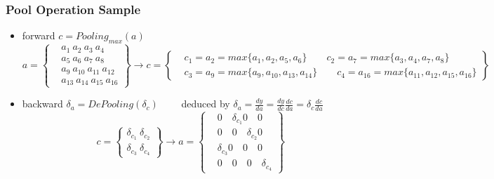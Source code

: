 \begin{frame}
\frametitle{Pool Operation Sample}
	\tiny
	\begin{itemize}
		\item forward $c=Pooling_{max}(a)$
			\begin{equation*}
				a=
				\left\{
					\begin{aligned}
						  &a_1 \ a_2 \ a_3 \ a_4
						\\&a_5 \ a_6 \ a_7 \ a_8
						\\&a_9 \ a_{10} \ a_{11} \ a_{12}
						\\&a_{13} \ a_{14} \ a_{15} \ a_{16}
					\end{aligned}
				\right\}
			\to	c=
				\left\{
					\begin{aligned}
						  &c_1=a_2=max\{a_1,a_2,a_5,a_6\} \qquad c_2=a_7=max\{a_3,a_4,a_7,a_8\}
						\\  &c_3=a_9=max\{a_9,a_{10},a_{13},a_{14}\} \qquad c_4=a_{16}=max\{a_{11},a_{12},a_{15},a_{16}\}
					\end{aligned}
				\right\}
			\end{equation*}
		\item backward $\delta_a=DePooling(\delta_c) \qquad $ deduced by $\delta_a=\frac{dy}{da}=\frac{dy}{dc}\frac{dc}{da}=\delta_c\frac{dc}{da}$
			\begin{equation*}
				c=
				\left\{
					\begin{aligned}
						 \delta_{c_1} \ \delta_{c_2} 
						\\ \delta_{c_3} \ \delta_{c_4}
					\end{aligned}
				\right\}
		\to	
				a=
				\left\{
					\begin{aligned}
						  &0 \quad \delta_{c_1}  0 \quad  0
						\\  &0 \quad 0 \quad  \delta_{c_2}  0
						\\  & \delta_{c_3}  0   \quad 0 \quad  0
						\\  &0 \quad 0 \quad  0 \quad  \delta_{c_4} 
					\end{aligned}
				\right\}
			\end{equation*}
	\end{itemize}
\end{frame}
